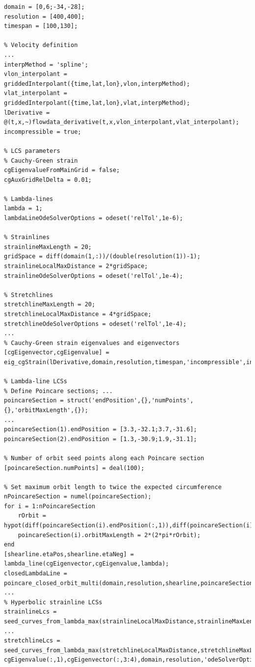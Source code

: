 \documentclass{article}
\begin{document}
\begin{lstlisting}[caption={LCS ocean demo: Parts of the demo script included in LCS Tool to compute LCS from an ocean data set},label=l:griddedInterp]
% Input parameters
domain = [0,6;-34,-28];
resolution = [400,400];
timespan = [100,130];

% Velocity definition
...
interpMethod = 'spline';
vlon_interpolant = griddedInterpolant({time,lat,lon},vlon,interpMethod);
vlat_interpolant = griddedInterpolant({time,lat,lon},vlat,interpMethod);
lDerivative = @(t,x,~)flowdata_derivative(t,x,vlon_interpolant,vlat_interpolant);
incompressible = true;

% LCS parameters
% Cauchy-Green strain
cgEigenvalueFromMainGrid = false;
cgAuxGridRelDelta = 0.01;

% Lambda-lines
lambda = 1;
lambdaLineOdeSolverOptions = odeset('relTol',1e-6);

% Strainlines
strainlineMaxLength = 20;
gridSpace = diff(domain(1,:))/(double(resolution(1))-1);
strainlineLocalMaxDistance = 2*gridSpace;
strainlineOdeSolverOptions = odeset('relTol',1e-4);

% Stretchlines
stretchlineMaxLength = 20;
stretchlineLocalMaxDistance = 4*gridSpace;
stretchlineOdeSolverOptions = odeset('relTol',1e-4);
...
% Cauchy-Green strain eigenvalues and eigenvectors
[cgEigenvector,cgEigenvalue] = eig_cgStrain(lDerivative,domain,resolution,timespan,'incompressible',incompressible,'eigenvalueFromMainGrid',cgEigenvalueFromMainGrid,'auxGridRelDelta',cgAuxGridRelDelta);

% Lambda-line LCSs
% Define Poincare sections; ...
poincareSection = struct('endPosition',{},'numPoints',{},'orbitMaxLength',{});
...
poincareSection(1).endPosition = [3.3,-32.1;3.7,-31.6];
poincareSection(2).endPosition = [1.3,-30.9;1.9,-31.1];

% Number of orbit seed points along each Poincare section
[poincareSection.numPoints] = deal(100);

% Set maximum orbit length to twice the expected circumference
nPoincareSection = numel(poincareSection);
for i = 1:nPoincareSection
    rOrbit = hypot(diff(poincareSection(i).endPosition(:,1)),diff(poincareSection(i).endPosition(:,2)));
    poincareSection(i).orbitMaxLength = 2*(2*pi*rOrbit);
end
[shearline.etaPos,shearline.etaNeg] = lambda_line(cgEigenvector,cgEigenvalue,lambda);
closedLambdaLine = poincare_closed_orbit_multi(domain,resolution,shearline,poincareSection,'odeSolverOptions',lambdaLineOdeSolverOptions);
...
% Hyperbolic strainline LCSs
strainlineLcs = seed_curves_from_lambda_max(strainlineLocalMaxDistance,strainlineMaxLength,cgEigenvalue(:,2),cgEigenvector(:,1:2),domain,resolution,'odeSolverOptions',strainlineOdeSolverOptions);
...
stretchlineLcs = seed_curves_from_lambda_max(stretchlineLocalMaxDistance,stretchlineMaxLength,-cgEigenvalue(:,1),cgEigenvector(:,3:4),domain,resolution,'odeSolverOptions',stretchlineOdeSolverOptions);
\end{lstlisting}
\end{document}

